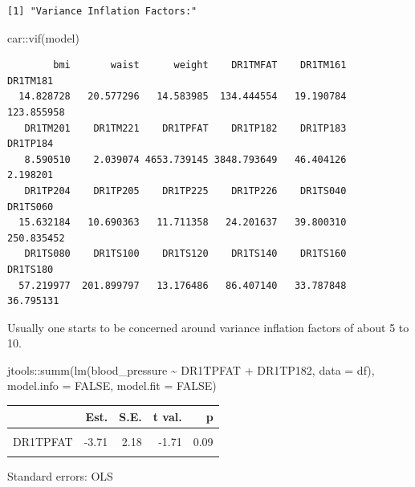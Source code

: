 \documentclass[
  letterpaper,
  DIV=11,
  numbers=noendperiod]{scrreport}
\newenvironment{Shaded}{\begin{snugshade}}{\end{snugshade}}
\newcommand{\AttributeTok}[1]{\textcolor[rgb]{0.40,0.45,0.13}{#1}}
\newcommand{\ConstantTok}[1]{\textcolor[rgb]{0.56,0.35,0.01}{#1}}
\newcommand{\FunctionTok}[1]{\textcolor[rgb]{0.28,0.35,0.67}{#1}}
\newcommand{\NormalTok}[1]{\textcolor[rgb]{0.00,0.23,0.31}{#1}}
\newcommand{\SpecialCharTok}[1]{\textcolor[rgb]{0.37,0.37,0.37}{#1}}
\begin{document}
\begin{verbatim}
[1] "Variance Inflation Factors:"
\end{verbatim}

\begin{Shaded}
\begin{Highlighting}[]
\NormalTok{car}\SpecialCharTok{::}\FunctionTok{vif}\NormalTok{(model)}
\end{Highlighting}
\end{Shaded}

\begin{verbatim}
        bmi       waist      weight    DR1TMFAT    DR1TM161    DR1TM181 
  14.828728   20.577296   14.583985  134.444554   19.190784  123.855958 
   DR1TM201    DR1TM221    DR1TPFAT    DR1TP182    DR1TP183    DR1TP184 
   8.590510    2.039074 4653.739145 3848.793649   46.404126    2.198201 
   DR1TP204    DR1TP205    DR1TP225    DR1TP226    DR1TS040    DR1TS060 
  15.632184   10.690363   11.711358   24.201637   39.800310  250.835452 
   DR1TS080    DR1TS100    DR1TS120    DR1TS140    DR1TS160    DR1TS180 
  57.219977  201.899797   13.176486   86.407140   33.787848   36.795131 
\end{verbatim}

Usually one starts to be concerned around variance inflation factors of
about 5 to 10.

\begin{Shaded}
\begin{Highlighting}[]
\NormalTok{jtools}\SpecialCharTok{::}\FunctionTok{summ}\NormalTok{(}\FunctionTok{lm}\NormalTok{(blood\_pressure }\SpecialCharTok{\textasciitilde{}}\NormalTok{ DR1TPFAT }\SpecialCharTok{+}\NormalTok{ DR1TP182, }\AttributeTok{data =}\NormalTok{ df), }\AttributeTok{model.info =} \ConstantTok{FALSE}\NormalTok{, }\AttributeTok{model.fit =} \ConstantTok{FALSE}\NormalTok{)}
\end{Highlighting}
\end{Shaded}

\begin{table}[!h]
\centering
\begin{threeparttable}
\begin{tabular}{lrrrr}
\toprule
  & Est. & S.E. & t val. & p\\
\midrule
\cellcolor{gray!6}{(Intercept)} & \cellcolor{gray!6}{-0.00} & \cellcolor{gray!6}{0.13} & \cellcolor{gray!6}{-0.00} & \cellcolor{gray!6}{1.00}\\
DR1TPFAT & -3.71 & 2.18 & -1.71 & 0.09\\
\cellcolor{gray!6}{DR1TP182} & \cellcolor{gray!6}{3.41} & \cellcolor{gray!6}{2.18} & \cellcolor{gray!6}{1.57} & \cellcolor{gray!6}{0.12}\\
\bottomrule
\end{tabular}
\begin{tablenotes}
\item Standard errors: OLS
\end{tablenotes}
\end{threeparttable}
\end{table}
\end{document}
